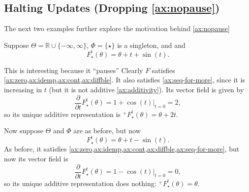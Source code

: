 \begin{subappendices}
{    \begin{center}
    \end{center}


    \subsection{Halting Updates (Dropping \ref{ax:nopause})}
    The next two examples further explore the motivation behind \cref{ax:nopause}

    \begin{example}
    Suppose $\Theta = \mathbb R \cup \{-\infty, \infty\}$, $\Phi = \{\star\}$ is a singleton, and
    and 
    \[
        F^t_{\!\star}(\theta) = \theta + t + \sin(t).
    \]

    This is interesting because it ``pauses'' 
    Clearly $F$ satisfies \cref{ax:zero,ax:idemp,ax:cont,ax:diffble}.
    It also satisfies \cref{ax:seq-for-more}, since it is increasing in $t$
    (but it is not additive \cref{ax:additivity}).
    Its vector field is given by 
    \[
        \frac{\partial}{\partial t} F^t_{\!\star}(\theta) = 1 + \cos(t) \Big|_{t=0}
         = 2,
    \]
    so its unique additive representation is
    $
        {^+}F^t_{\!\star}(\theta) = \theta + 2 t.
    $
    \end{example}

    \begin{example}
    Now suppose $\Theta$ and $\Phi$ are as before,
    but now
    \[
        F^t_{\!\star}(\theta) = \theta + t - \sin(t).
    \]
    As before, it satisfies \cref{ax:zero,ax:idemp,ax:cont,ax:diffble,ax:seq-for-more},
    but now its vector field is
    \[
        \frac{\partial}{\partial t} F^t_{\!\star}(\theta) = 1 - \cos(t) \Big|_{t=0}
         = 0,
    \]
    so its unique additive representation does nothing:
    $
        {^+}F^t_{\!\star}(\theta) = \theta. 
    $
    \end{example}

}


\end{subappendices}
